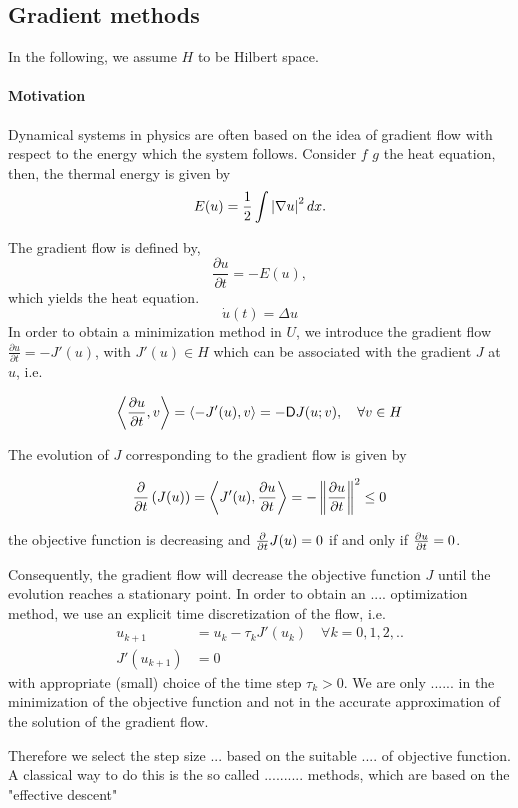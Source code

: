 \subsection{Gradient methods}
In the following, we assume $H$ to be Hilbert space.
\paragraph{Motivation}
	Dynamical systems in physics are often based on the idea of gradient flow with respect to the energy which the system follows. Consider $f$ $g$ the heat equation, then, the thermal energy is given by
	\[
		E(u)=\frac{1}{2}\int \left|\nabla u\right|^2 dx.
	\]
	
	The gradient flow is defined by,
	\[
		\frac{\partial u}{\partial t} = -E(u),
	\]
	which yields the heat equation.
	\[
		\dot{u}(t)=\Delta u
	\]
In order to obtain a minimization method in $U$, we introduce the gradient flow $\frac{\partial u}{\partial t} = -J'(u)$, with $J'(u)\in H$ which can be associated with the gradient $J$ at $u$, i.e.

\[
	\left\langle \frac{\partial u}{{\partial t}}, v \right\rangle = \left\langle-J'(u), v\right\rangle = -\mathsf{D}J(u;v), \quad \forall v \in H
\]

The evolution of $J$ corresponding to the gradient flow is given by

\[
	\frac{\partial}{\partial t} \left(J(u)\right) = \left\langle J'(u), \frac{\partial u}{{\partial t}} \right\rangle = -\left\lVert\frac{\partial u}{{\partial t}}\right\rVert^2 \leq 0
\]

the objective function is decreasing and $\frac{\partial }{{\partial t}} J(u) =0$ if and only if $\frac{\partial u}{{\partial t}}=0$.

Consequently, the gradient flow will decrease the objective function $J$ until the evolution reaches a stationary point. In order to obtain an .... optimization method, we use an explicit time discretization of the flow, i.e.
\begin{align*}
u_{k+1}&=u_k - \tau_kJ'(u_k) \quad \forall k=0,1,2,.. \\
J'(u_{k+1})&=0
\end{align*}
with appropriate (small) choice of the time step $\tau_k >0$. We are only ...... in the minimization of the objective function and not in the accurate approximation of the solution of the gradient flow.

Therefore we select the step size ... based on the suitable .... of objective function. A classical way to do this is the so called .......... methods, which are based on the "effective descent"

